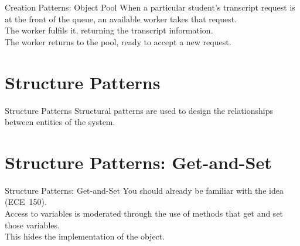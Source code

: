 \documentclass[14pt,aspectratio=169]{beamer}
\begin{document}
\begin{frame}{Creation Patterns: Object Pool}
When a particular student's transcript request is at the front of the queue, an available worker takes that request. \\
\vspace{1em}
The worker fulfils it, returning the transcript information. \\
\vspace{1em}
The worker returns to the pool, ready to accept a new request.
\end{frame}



\section*{Structure Patterns}



\begin{frame}{Structure Patterns}
\large
Structural patterns are used to design the relationships between entities of the system.
\end{frame}



\section*{Structure Patterns: Get-and-Set}



\begin{frame}{Structure Patterns: Get-and-Set}
You should already be familiar with the idea (ECE~150).\\
\vspace{1em}
Access to variables is moderated through the use of methods that get and set those variables. \\
\vspace{1em}
This hides the implementation of the object.
\end{frame}
\end{document}
